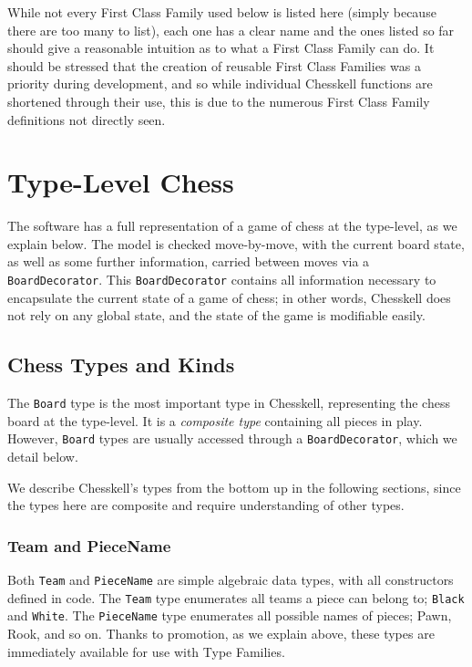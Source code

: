 \documentclass[12pt, a4paper, bibliography=totocnumbered]{scrreprt}
\newcommand{\inline}[1]{\lstinline[basicstyle=\ttfamily\footnotesize]{#1}}
\begin{document}
While not every First Class Family used below is listed here (simply because there are too many to list), each one has a clear name and the ones listed so far should give a reasonable intuition as to what a First Class Family can do. It should be stressed that the creation of reusable First Class Families was a priority during development, and so while individual Chesskell functions are shortened through their use, this is due to the numerous First Class Family definitions not directly seen.

\section{Type-Level Chess}

The software has a full representation of a game of chess at the type-level, as we explain below. The model is checked move-by-move, with the current board state, as well as some further information, carried between moves via a \inline{BoardDecorator}. This \inline{BoardDecorator} contains all information necessary to encapsulate the current state of a game of chess; in other words, Chesskell does not rely on any global state, and the state of the game is modifiable easily.

\subsection{Chess Types and Kinds}

The \inline{Board} type is the most important type in Chesskell, representing the chess board at the type-level. It is a \emph{composite type} containing all pieces in play. However, \inline{Board} types are usually accessed through a  \inline{BoardDecorator}, which we detail below.

We describe Chesskell's types from the bottom up in the following sections, since the types here are composite and require understanding of other types.

\subsubsection{Team and PieceName}

Both \inline{Team} and \inline{PieceName} are simple algebraic data types, with all constructors defined in code. The \inline{Team} type enumerates all teams a piece can belong to; \inline{Black} and \inline{White}. The \inline{PieceName} type enumerates all possible names of pieces; Pawn, Rook, and so on. Thanks to promotion, as we explain above, these types are immediately available for use with Type Families.
\end{document}
